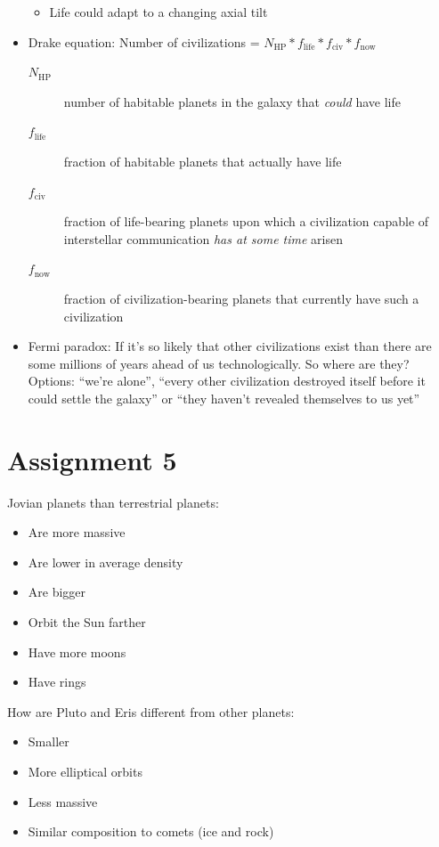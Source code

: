 \documentclass[12pt]{article}
\begin{document}
\begin{itemize}
\begin{itemize}
        \item Life could adapt to a changing axial tilt
    \end{itemize}
    \item Drake equation: Number of civilizations = $N_\text{HP} * f_\text{life} * f_\text{civ} * f_\text{now}$
    \begin{description}
        \item[$N_\text{HP}$] number of habitable planets in the galaxy that \emph{could} have life
        \item[$f_\text{life}$] fraction of habitable planets that actually have life
        \item[$f_\text{civ}$] fraction of life-bearing planets upon which a civilization capable of interstellar communication \emph{has at some time} arisen
        \item[$f_\text{now}$] fraction of civilization-bearing planets that currently have such a civilization
    \end{description}
    \item Fermi paradox: If it's so likely that other civilizations exist than there are some millions of years ahead of us technologically.  So where are they?  Options: ``we're alone'', ``every other civilization destroyed itself before it could settle the galaxy'' or ``they haven't revealed themselves to us yet''
\end{itemize}

\section{Assignment 5}


Jovian planets \underline{\hspace{5em}} than terrestrial planets:
\begin{itemize}
    \item Are more massive
    \item Are lower in average density
    \item Are bigger
    \item Orbit the Sun farther
    \item Have more moons
    \item Have rings
\end{itemize}

How are Pluto and Eris different from other planets:
\begin{itemize}
    \item Smaller
    \item More elliptical orbits
    \item Less massive
    \item Similar composition to comets (ice and rock)
\end{itemize}
\end{document}
